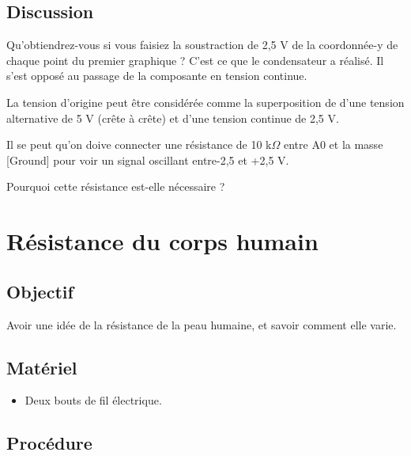 \documentclass{book}
\begin{document}
\subsection{Discussion}


Qu'obtiendrez-vous si vous faisiez la soustraction de 2,5 V de la coordonnée-y de chaque point du premier graphique ? C'est ce que le condensateur a réalisé. Il s'est opposé au passage de la composante en tension continue.



La tension d'origine peut être considérée comme la superposition de d'une tension alternative de 5 V (crête à crête) et d'une tension continue de 2,5 V.



Il se peut qu'on doive connecter une résistance de 10 k$\Omega$  entre A0 et la masse [Ground] pour voir un signal oscillant entre-2,5 et +2,5 V.



Pourquoi cette résistance est-elle nécessaire ?







\section{Résistance du corps humain}



\subsection{Objectif}


Avoir une idée de la résistance de la peau humaine, et savoir comment elle varie.




\subsection{Matériel}


\begin{itemize}
  \item Deux bouts de fil électrique.
\end{itemize}

\subsection{Procédure}
\end{document}
